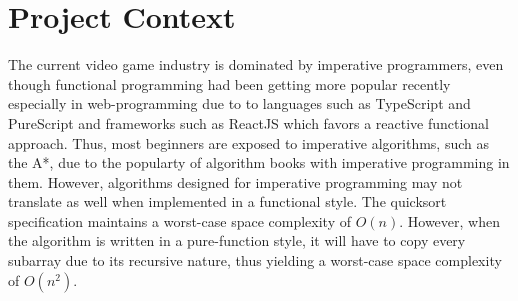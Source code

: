 






\section{Project Context}
The current video game industry is dominated by imperative programmers, even though functional programming had been 
getting more popular recently especially in web-programming due to to languages such as TypeScript and PureScript and 
frameworks such as ReactJS which favors a reactive functional approach. Thus, most beginners are exposed to 
imperative algorithms, such as the A*, due to the popularty of algorithm books with imperative programming in them.\cite{CLRS,Knuth1997,Skiena}
However, algorithms designed for imperative programming may not translate as well when implemented in a functional style.
The quicksort specification maintains a worst-case space complexity of $O(n)$. However, when the algorithm is written in a 
pure-function style, it will have to copy every subarray due to its recursive nature, thus yielding  a worst-case space complexity 
of $O(n^2)$. 

